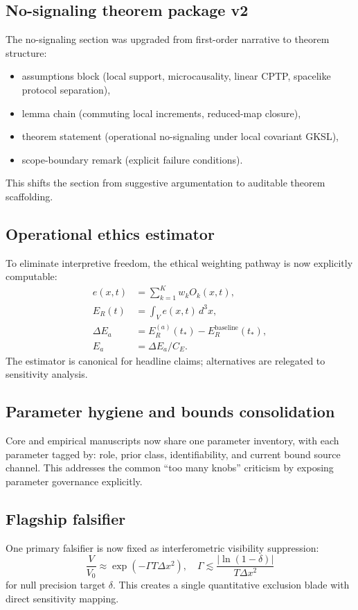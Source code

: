 \documentclass[11pt]{article}
\begin{document}
\subsection{No-signaling theorem package v2}
The no-signaling section was upgraded from first-order narrative to theorem structure:
\begin{itemize}
\item assumptions block (local support, microcausality, linear CPTP, spacelike protocol separation),
\item lemma chain (commuting local increments, reduced-map closure),
\item theorem statement (operational no-signaling under local covariant GKSL),
\item scope-boundary remark (explicit failure conditions).
\end{itemize}
This shifts the section from suggestive argumentation to auditable theorem scaffolding.

\subsection{Operational ethics estimator}
To eliminate interpretive freedom, the ethical weighting pathway is now explicitly computable:
\begin{align}
e(x,t) &= \sum_{k=1}^{K} w_k O_k(x,t), \\
E_R(t) &= \int_V e(x,t)\,d^3x, \\
\Delta E_a &= E_R^{(a)}(t_*) - E_R^{\mathrm{baseline}}(t_*), \\
E_a &= \Delta E_a / C_E.
\end{align}
The estimator is canonical for headline claims; alternatives are relegated to sensitivity analysis.

\subsection{Parameter hygiene and bounds consolidation}
Core and empirical manuscripts now share one parameter inventory, with each parameter tagged by:
role, prior class, identifiability, and current bound source channel.
This addresses the common ``too many knobs'' criticism by exposing parameter governance explicitly.

\subsection{Flagship falsifier}
One primary falsifier is now fixed as interferometric visibility suppression:
\begin{equation}
\frac{V}{V_0} \approx \exp(-\Gamma T \Delta x^2), \quad
\Gamma \lesssim \frac{|\ln(1-\delta)|}{T\Delta x^2}
\end{equation}
for null precision target $\delta$. This creates a single quantitative exclusion blade with direct sensitivity mapping.
\end{document}
